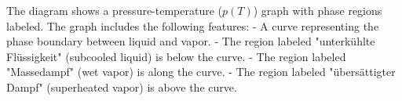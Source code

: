 The diagram shows a pressure-temperature (\( p(T) \)) graph with phase regions labeled. The graph includes the following features:  
- A curve representing the phase boundary between liquid and vapor.  
- The region labeled "unterkühlte Flüssigkeit" (subcooled liquid) is below the curve.  
- The region labeled "Massedampf" (wet vapor) is along the curve.  
- The region labeled "übersättigter Dampf" (superheated vapor) is above the curve.